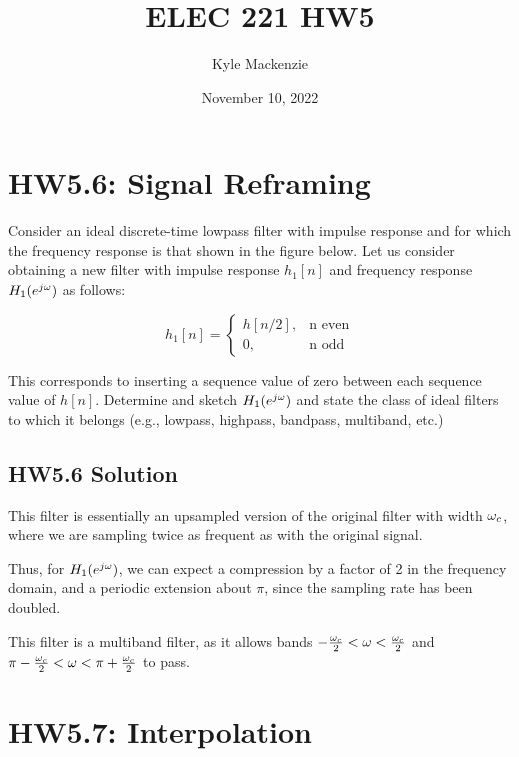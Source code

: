 \documentclass[11pt, fleqn]{article}
\title{ELEC 221 HW5}
\author{Kyle Mackenzie}
\date{November 10, 2022}
\begin{document}
\allowdisplaybreaks

\maketitle

\pagebreak

\section*{HW5.6: Signal Reframing}
Consider an ideal discrete-time lowpass filter with impulse response and for which the frequency response is that shown in the figure below. Let us consider obtaining a new filter with impulse response $ h_1[n]$ and frequency response $ H_1(e^{j\omega}) $ as follows:

$$
    h_1[n] = \begin{cases}
        h[n/2], & \text{n even} \\
        0, & \text{n odd}
    \end{cases}
$$


This corresponds to inserting a sequence value of zero between each sequence value of $ h[n] $. Determine and sketch $ H_1(e^{j\omega}) $ and state the class of ideal filters to which it belongs (e.g., lowpass, highpass, bandpass, multiband, etc.) 


\subsection*{HW5.6 Solution}

This filter is essentially an upsampled version of the original filter with width $ \omega_c $, where we are sampling twice as frequent as with the original signal.

Thus, for $ H_1(e^{j\omega}) $, we can expect a compression by a factor of 2 in the frequency domain, and a periodic extension about $ \pi $, since the sampling rate has been doubled.


This filter is a multiband filter, as it allows bands $-\frac{\omega_c}{2} < \omega < \frac{\omega_c}{2}$ and $\pi-\frac{\omega_c}{2} < \omega < \pi + \frac{\omega_c}{2}$ to pass.

\pagebreak

\section*{HW5.7: Interpolation}
\end{document}

